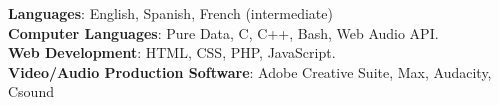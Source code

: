 \textbf{Languages}: English, Spanish, French (intermediate)
\\
\textbf{Computer Languages}: Pure Data, C, C++, Bash, Web Audio API.
\\
\textbf{Web Development}: HTML, CSS, PHP, JavaScript.
\\
\textbf{Video/Audio Production Software}: Adobe Creative Suite, Max, Audacity, Csound   